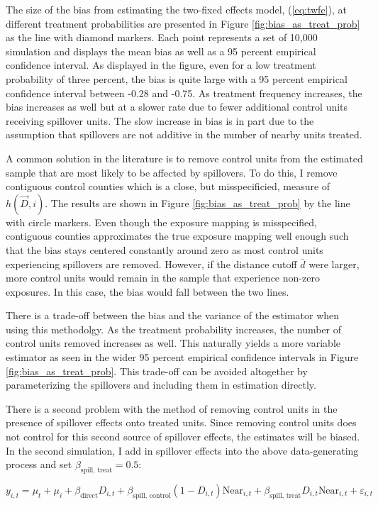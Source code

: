 \documentclass[11pt]{article}
\begin{document}
The size of the bias from estimating the two-fixed effects model, (\ref{eq:twfe}), at different treatment probabilities are presented in Figure \ref{fig:bias_as_treat_prob} as the line with diamond markers. Each point represents a set of 10,000 simulation and displays the mean bias as well as a 95 percent empirical confidence interval. As displayed in the figure, even for a low treatment probability of three percent, the bias is quite large with a 95 percent empirical confidence interval between -0.28 and -0.75. As treatment frequency increases, the bias increases as well but at a slower rate due to fewer additional control units receiving spillover units. The slow increase in bias is in part due to the assumption that spillovers are not additive in the number of nearby units treated.

A common solution in the literature is to remove control units from the estimated sample that are most likely to be affected by spillovers. To do this, I remove contiguous control counties which is a close, but misspecificied, measure of $h(\vec{D}, i)$. The results are shown in Figure \ref{fig:bias_as_treat_prob} by the line with circle markers. Even though the exposure mapping is misspecified, contiguous counties approximates the true exposure mapping well enough such that the bias stays centered constantly around zero as most control units experiencing spillovers are removed. However, if the distance cutoff $\bar{d}$ were larger, more control units would remain in the sample that experience non-zero exposures. In this case, the bias would fall between the two lines.

There is a trade-off between the bias and the variance of the estimator when using this methodolgy. As the treatment probability increases, the number of control units removed increases as well. This naturally yields a more variable estimator as seen in the wider 95 percent empirical confidence intervals in Figure \ref{fig:bias_as_treat_prob}. This trade-off can be avoided altogether by parameterizing the spillovers and including them in estimation directly.

There is a second problem with the method of removing control units in the presence of spillover effects onto treated units. Since removing control units does not control for this second source of spillover effects, the estimates will be biased. In the second simulation, I add in spillover effects into the above data-generating process and set $\beta_{\text{spill, treat}} = 0.5$:

\begin{equation}
    \label{eq:dgp2} 
    y_{i,t} = \mu_t + \mu_i + \beta_{\text{direct}} D_{i,t} + \beta_{\text{spill, control}} (1-D_{i,t}) \text{Near}_{i,t} + \beta_{\text{spill, treat}} D_{i,t} \text{Near}_{i,t} + \varepsilon_{i,t}   
\end{equation}
\end{document}
